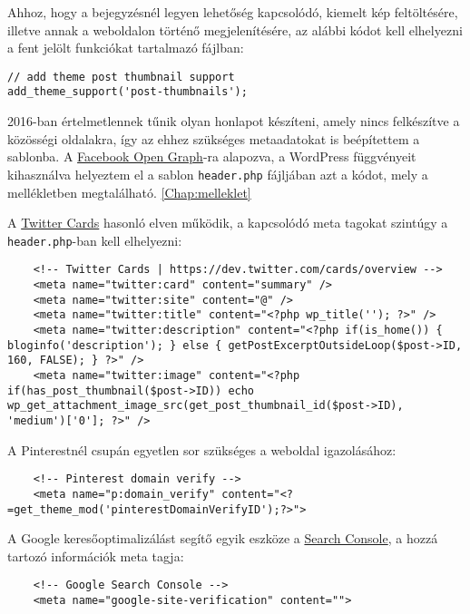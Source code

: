 Ahhoz, hogy a bejegyzésnél legyen lehetőség kapcsolódó, kiemelt kép feltöltésére, illetve annak a weboldalon történő megjelenítésére, az alábbi kódot kell elhelyezni a fent jelölt funkciókat tartalmazó fájlban:

\begin{lstlisting}
// add theme post thumbnail support
add_theme_support('post-thumbnails');
\end{lstlisting}

2016-ban értelmetlennek tűnik olyan honlapot készíteni, amely nincs felkészítve a közösségi oldalakra, így az ehhez szükséges metaadatokat is beépítettem a sablonba. A \href{https://developers.facebook.com/docs/sharing/webmasters}{Facebook Open Graph}-ra alapozva, a WordPress függvényeit kihasználva helyeztem el a sablon \texttt{header.php} fájljában azt a kódot, mely a mellékletben megtalálható. \ref{Chap:melleklet}

A \href{https://dev.twitter.com/cards/overview}{Twitter Cards} hasonló elven működik, a kapcsolódó meta tagokat szintúgy a \texttt{header.php}-ban kell elhelyezni:

\begin{lstlisting}
	<!-- Twitter Cards | https://dev.twitter.com/cards/overview -->
	<meta name="twitter:card" content="summary" />
	<meta name="twitter:site" content="@" />
	<meta name="twitter:title" content="<?php wp_title(''); ?>" />
	<meta name="twitter:description" content="<?php if(is_home()) { bloginfo('description'); } else { getPostExcerptOutsideLoop($post->ID, 160, FALSE); } ?>" />
	<meta name="twitter:image" content="<?php if(has_post_thumbnail($post->ID)) echo wp_get_attachment_image_src(get_post_thumbnail_id($post->ID), 'medium')['0']; ?>" />
\end{lstlisting}

A Pinterestnél csupán egyetlen sor szükséges a weboldal igazolásához:

\begin{lstlisting}
	<!-- Pinterest domain verify -->
	<meta name="p:domain_verify" content="<?=get_theme_mod('pinterestDomainVerifyID');?>">
\end{lstlisting}

A Google keresőoptimalizálást segítő egyik eszköze a \href{https://www.google.com/webmasters/tools/home?hl=HU}{Search Console}, a hozzá tartozó információk meta tagja:

\begin{lstlisting}
	<!-- Google Search Console -->
	<meta name="google-site-verification" content="">
\end{lstlisting}

